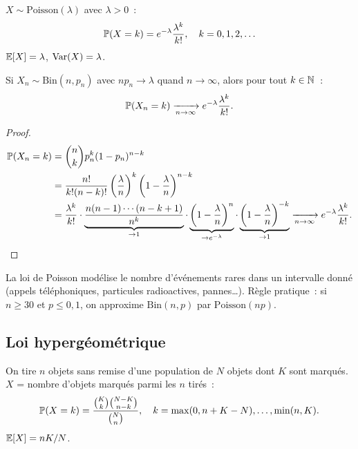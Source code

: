 \begin{definition}[Poisson]
$X \sim \text{Poisson}(\lambda)$ avec $\lambda > 0$~:
\[
    \mathbb{P}(X = k) = e^{-\lambda} \frac{\lambda^k}{k!}, \quad k = 0, 1, 2, \ldots
\]
$\mathbb{E}[X] = \lambda$, $\mathrm{Var}(X) = \lambda$.
\end{definition}

\begin{theoreme}
Si $X_n \sim \text{Bin}(n, p_n)$ avec $n p_n \to \lambda$ quand $n \to \infty$,
alors pour tout $k \in \mathbb{N}$~:
\[
    \mathbb{P}(X_n = k) \xrightarrow[n \to \infty]{} e^{-\lambda} \frac{\lambda^k}{k!}.
\]
\end{theoreme}

\begin{proof}
\begin{align*}
    \mathbb{P}(X_n = k) &= \binom{n}{k} p_n^k (1-p_n)^{n-k} \\
    &= \frac{n!}{k!(n-k)!} \left(\frac{\lambda}{n}\right)^k
       \left(1 - \frac{\lambda}{n}\right)^{n-k} \\
    &= \frac{\lambda^k}{k!} \cdot \underbrace{\frac{n(n-1)\cdots(n-k+1)}{n^k}}_{\to 1}
       \cdot \underbrace{\left(1 - \frac{\lambda}{n}\right)^n}_{\to e^{-\lambda}}
       \cdot \underbrace{\left(1 - \frac{\lambda}{n}\right)^{-k}}_{\to 1}
    \xrightarrow[n \to \infty]{} e^{-\lambda} \frac{\lambda^k}{k!}. \qedhere
\end{align*}
\end{proof}

\begin{intuition}[title=\textbf{Quand utiliser Poisson~?}]
La loi de Poisson mod\'elise le nombre d'\'ev\'enements rares dans un intervalle
donn\'e (appels t\'el\'ephoniques, particules radioactives, pannes\ldots). R\`egle
pratique~: si $n \geq 30$ et $p \leq 0{,}1$, on approxime $\text{Bin}(n,p)$ par
$\text{Poisson}(np)$.
\end{intuition}

\subsection{Loi hyperg\'eom\'etrique}

\begin{definition}
On tire $n$ objets sans remise d'une population de $N$ objets dont $K$ sont
marqu\'es. $X$ = nombre d'objets marqu\'es parmi les $n$ tir\'es~:
\[
    \mathbb{P}(X = k) = \frac{\binom{K}{k}\binom{N-K}{n-k}}{\binom{N}{n}},
    \quad k = \max(0, n+K-N), \ldots, \min(n, K).
\]
$\mathbb{E}[X] = nK/N$.
\end{definition}

